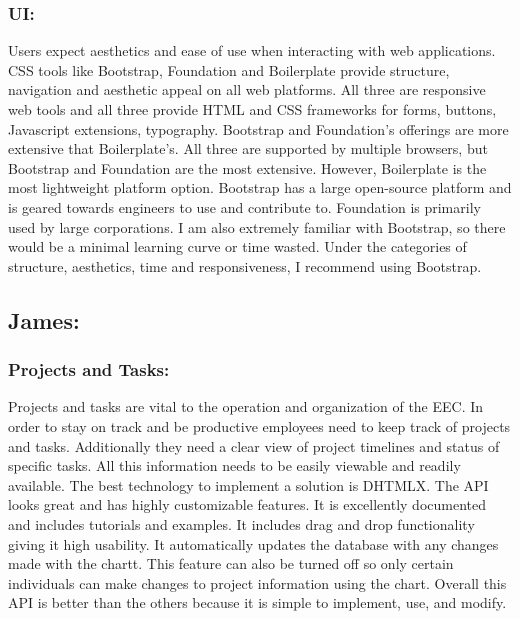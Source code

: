 \documentclass[letterpaper,10pt,titlepage,journal,compsoc,draftclsnofoot,onecolumn]{IEEEtran}
\newcommand\tab[1][1cm]{\hspace*{#1}}
\begin{document}
\subsubsection{UI:}
\tab Users expect aesthetics and ease of use when interacting with web applications. CSS tools like Bootstrap, Foundation and Boilerplate provide structure, navigation and aesthetic appeal on all web platforms. All three are responsive web tools and all three provide HTML and CSS frameworks for forms, buttons, Javascript extensions, typography. Bootstrap and Foundation’s offerings are more extensive that Boilerplate’s. All three are supported by multiple browsers, but Bootstrap and Foundation are the most extensive. However, Boilerplate is the most lightweight platform option. Bootstrap has a large open-source platform and is geared towards engineers to use and contribute to. Foundation is primarily used by large corporations. I am also extremely familiar with Bootstrap, so there would be a minimal learning curve or time wasted. Under the categories of structure, aesthetics, time and responsiveness, I recommend using Bootstrap. \newline	

\subsection{James:}
\subsubsection{Projects and Tasks:}
\tab Projects and tasks are vital to the operation and organization of the EEC. In order to stay on track and be productive employees need to keep track of projects and tasks. Additionally they need a clear view of project timelines and status of specific tasks. All this information needs to be easily viewable and readily available. The best technology to implement a solution is DHTMLX. The API looks great and has highly customizable features. It is excellently documented and includes tutorials and examples. It includes drag and drop functionality giving it high usability. It automatically updates the database with any changes made with the chartt. This feature can also be turned off so only certain individuals can make changes to project information using the chart. Overall this API is better than the others because it is simple to implement, use, and modify. \newline
\end{document}
